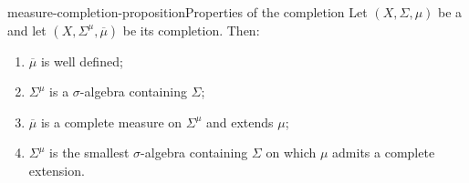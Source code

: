 \documentclass[preview]{standalone}
\begin{document}
\begin{snippetproposition}{measure-completion-proposition}{Properties of the completion}
    Let \((X,\Sigma,\mu)\) be a \measurespace and let
    \((X,\Sigma^\mu,\overline\mu)\) be its completion. Then:
    \begin{enumerate}
        \item \(\overline\mu\) is well defined;
        \item \(\Sigma^\mu\) is a \(\sigma\)-algebra containing \(\Sigma\);
        \item \(\overline\mu\) is a complete measure on \(\Sigma^\mu\) and
        extends \(\mu\);
        \item \(\Sigma^\mu\) is the smallest \(\sigma\)-algebra containing
        \(\Sigma\) on which \(\mu\) admits a complete extension.
    \end{enumerate}
\end{snippetproposition}
\end{document}
